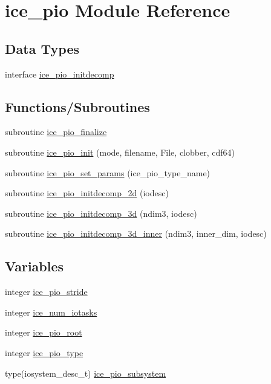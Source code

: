 \hypertarget{namespaceice__pio}{
\section{ice\_\-pio Module Reference}
\label{namespaceice__pio}
}
\subsection*{Data Types}
\begin{DoxyCompactItemize}
\item 
interface \hyperlink{interfaceice__pio_1_1ice__pio__initdecomp}{ice\_\-pio\_\-initdecomp}
\end{DoxyCompactItemize}
\subsection*{Functions/Subroutines}
\begin{DoxyCompactItemize}
\item 
subroutine \hyperlink{namespaceice__pio_a82e41ef2d2fdafcbd23064613f27c5f1}{ice\_\-pio\_\-finalize}
\item 
subroutine \hyperlink{namespaceice__pio_a14b08b2f773c9970e0938770ad4746e2}{ice\_\-pio\_\-init} (mode, filename, File, clobber, cdf64)
\item 
subroutine \hyperlink{namespaceice__pio_a109c38fa2166ac88371fb66b04aa16a5}{ice\_\-pio\_\-set\_\-params} (ice\_\-pio\_\-type\_\-name)
\item 
subroutine \hyperlink{namespaceice__pio_abd0ade136046f0940881df9f9d8c85f3}{ice\_\-pio\_\-initdecomp\_\-2d} (iodesc)
\item 
subroutine \hyperlink{namespaceice__pio_ad58ca6d958a4735d1709586ad6fde92c}{ice\_\-pio\_\-initdecomp\_\-3d} (ndim3, iodesc)
\item 
subroutine \hyperlink{namespaceice__pio_affe281885b53719d3c30c772637990db}{ice\_\-pio\_\-initdecomp\_\-3d\_\-inner} (ndim3, inner\_\-dim, iodesc)
\end{DoxyCompactItemize}
\subsection*{Variables}
\begin{DoxyCompactItemize}
\item 
integer \hyperlink{namespaceice__pio_a5de9334d10947cea25743c63ea790857}{ice\_\-pio\_\-stride}
\item 
integer \hyperlink{namespaceice__pio_a727ea1a597ce3ed71fc1e986d39e263c}{ice\_\-num\_\-iotasks}
\item 
integer \hyperlink{namespaceice__pio_a005816f4168d35918e2c74a88989e871}{ice\_\-pio\_\-root}
\item 
integer \hyperlink{namespaceice__pio_a29c1f71d91a554fa266112edb114b555}{ice\_\-pio\_\-type}
\item 
type(iosystem\_\-desc\_\-t) \hyperlink{namespaceice__pio_ad7b25bee3af2d23622eded54fa930040}{ice\_\-pio\_\-subsystem}
\end{DoxyCompactItemize}


